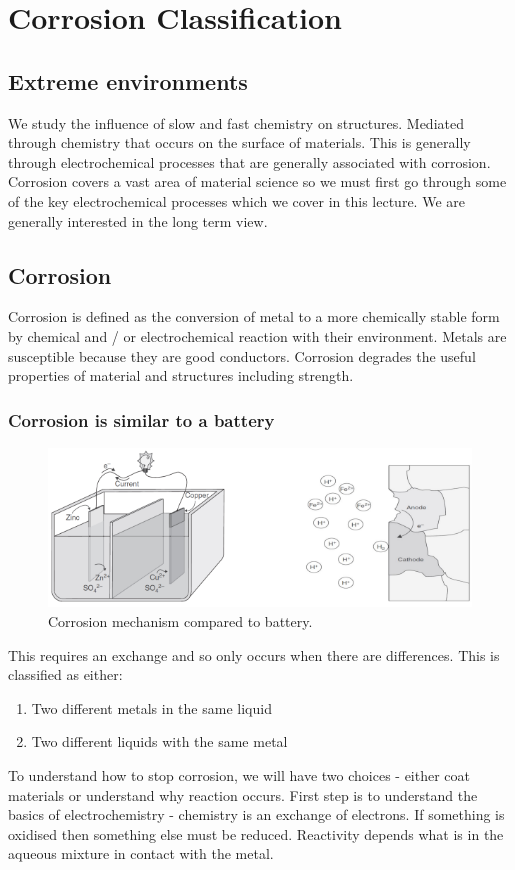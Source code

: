 \chapter{Corrosion Classification}
\section{Extreme environments}
We study the influence of slow and fast chemistry on structures. Mediated through chemistry that occurs on the surface of materials. This is generally through electrochemical processes that are generally associated with corrosion. Corrosion covers a vast area of material science so we must first go through some of the key electrochemical processes which we cover in this lecture. We are generally interested in the long term view.
\section{Corrosion}
Corrosion is defined as the conversion of metal to a more chemically stable form by chemical and / or electrochemical reaction with their environment. Metals are susceptible because they are good conductors. Corrosion degrades the useful properties of material and structures including strength.
\subsection{Corrosion is similar to a battery}
\begin{figure}[H]
    \centering
    \includegraphics[width = 0.8 \textwidth]{img/figure70.png}
    \caption{Corrosion mechanism compared to battery.}
\end{figure}
This requires an exchange and so only occurs when there are differences. This is classified as either:
\begin{enumerate}
    \item Two different metals in the same liquid
    \item Two different liquids with the same metal
\end{enumerate}
To understand how to stop corrosion, we will have two choices - either coat materials or understand why reaction occurs. First step is to understand the basics of electrochemistry - chemistry is an exchange of electrons. If something is oxidised then something else must be reduced. Reactivity depends what is in the aqueous mixture in contact with the metal.

